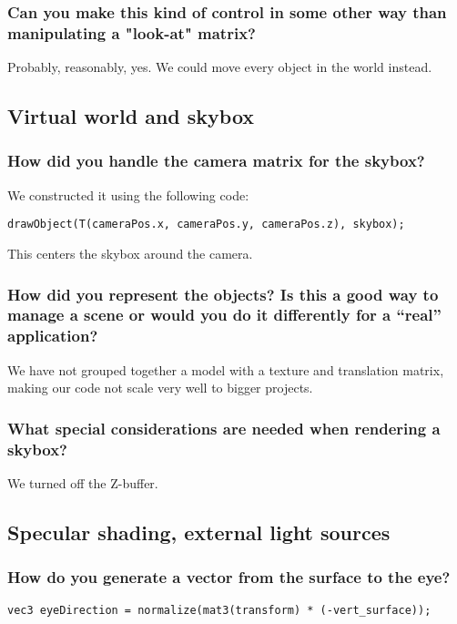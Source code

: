 \documentclass[a4paper,12pt]{article}
\begin{document}
\subsubsection{Can you make this kind of control in some other way
  than manipulating a "look-at" matrix?}
Probably, reasonably, yes. We could move every object in the world instead.

\subsection{Virtual world and skybox}
\subsubsection{How did you handle the camera matrix for the skybox?}
We constructed it using the following code:
\begin{lstlisting}[float,label=lst:cameramatrix,caption=nextHopInfo: Camera matrix code]
  	drawObject(T(cameraPos.x, cameraPos.y, cameraPos.z), skybox);
\end{lstlisting}
This centers the skybox around the camera.

\subsubsection{How did you represent the objects? Is this a good way to manage a scene or would you do it differently for a ``real'' application?}
We have not grouped together a model with a texture and translation matrix, making our code not scale very well to bigger projects.

\subsubsection{What special considerations are needed when rendering a skybox?}
We turned off the Z-buffer.

\subsection{Specular shading, external light sources}
\subsubsection{How do you generate a vector from the surface to the eye? }
\begin{lstlisting}[float,label=lst:label,caption=nextHopInfo: Surface to eye]
	vec3 eyeDirection = normalize(mat3(transform) * (-vert_surface));
\end{lstlisting}
\end{document}
